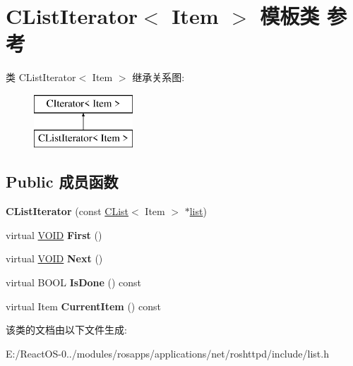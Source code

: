 \hypertarget{class_c_list_iterator}{}\section{C\+List\+Iterator$<$ Item $>$ 模板类 参考}
\label{class_c_list_iterator}
类 C\+List\+Iterator$<$ Item $>$ 继承关系图\+:\begin{figure}[H]
\begin{center}
\leavevmode
\includegraphics[height=2.000000cm]{class_c_list_iterator}
\end{center}
\end{figure}
\subsection*{Public 成员函数}
\begin{DoxyCompactItemize}
\item 
\mbox{\label{class_c_list_iterator_a48f3968ea035bbd15034e378b5532f3c}} 
{\bfseries C\+List\+Iterator} (const \hyperlink{class_c_list}{C\+List}$<$ Item $>$ $\ast$\hyperlink{classlist}{list})
\item 
\mbox{\label{class_c_list_iterator_a234fbe6a52356ac5c31b642811bfa627}} 
virtual \hyperlink{interfacevoid}{V\+O\+ID} {\bfseries First} ()
\item 
\mbox{\label{class_c_list_iterator_a63bf0627f387378d38807dd0c3b63d49}} 
virtual \hyperlink{interfacevoid}{V\+O\+ID} {\bfseries Next} ()
\item 
\mbox{\label{class_c_list_iterator_a7ad5a937823333a1c8e4966dbad882fb}} 
virtual B\+O\+OL {\bfseries Is\+Done} () const
\item 
\mbox{\label{class_c_list_iterator_a8988613f3fe8dc2eb3b51b97944f7675}} 
virtual Item {\bfseries Current\+Item} () const
\end{DoxyCompactItemize}


该类的文档由以下文件生成\+:\begin{DoxyCompactItemize}
\item 
E\+:/\+React\+O\+S-\/0../modules/rosapps/applications/net/roshttpd/include/list.\+h\end{DoxyCompactItemize}
